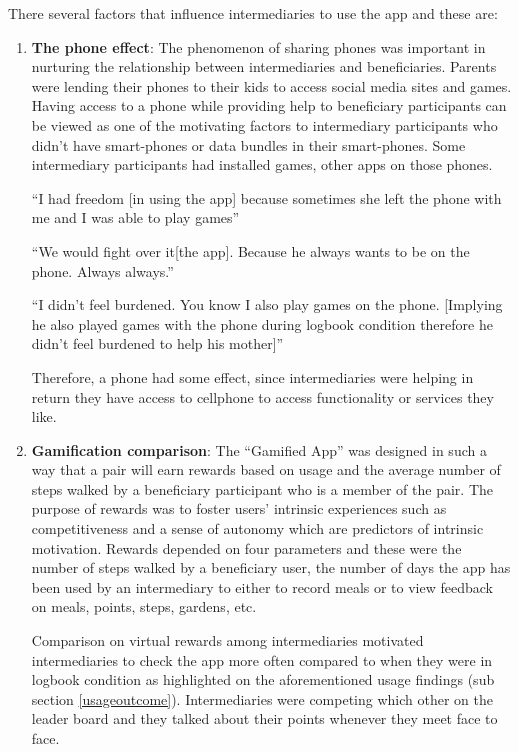 There several factors that influence intermediaries to use the app and these are:
\begin{enumerate}

\item{\textbf{The phone effect}}: The phenomenon of sharing phones was important in nurturing the relationship between intermediaries and beneficiaries. Parents were lending their phones to their kids to access social media sites and games. Having access to a phone while providing help to beneficiary participants can be viewed as one of the motivating factors to intermediary participants who didn't have smart-phones or data bundles in their smart-phones. Some intermediary participants had installed games, other apps on those phones.

 {``I had freedom [in using the app] because sometimes she left the phone with me and I was able to play games''}

 {``We would fight over it[the app]. Because he always wants to be on the phone. Always always.''}

 {``I didn't feel burdened. You know I also play games on the phone. [Implying he also played games with the phone during logbook condition therefore he didn't feel burdened to help his mother]''}

Therefore, a phone had some effect, since intermediaries were helping in return they have access to cellphone to access functionality or services they like.

\item{\textbf{Gamification comparison}}: The ``Gamified App'' was designed in such a way that a pair will earn rewards based on usage and the average number of steps walked by a beneficiary participant who is a member of the pair. The purpose of rewards was to foster users' intrinsic experiences such as competitiveness and a sense of autonomy which are predictors of intrinsic motivation. Rewards depended on four parameters and these were the number of steps walked by a beneficiary user, the number of days the app has been used by an intermediary to either to record meals or to view feedback on meals, points, steps, gardens, etc. 

Comparison on virtual rewards among intermediaries motivated intermediaries to check the app more often compared to when they were in logbook condition as highlighted on the aforementioned usage findings (sub section \ref{usageoutcome}). Intermediaries were competing which other on the leader board and they talked about their points whenever they meet face to face.


\end{enumerate}
